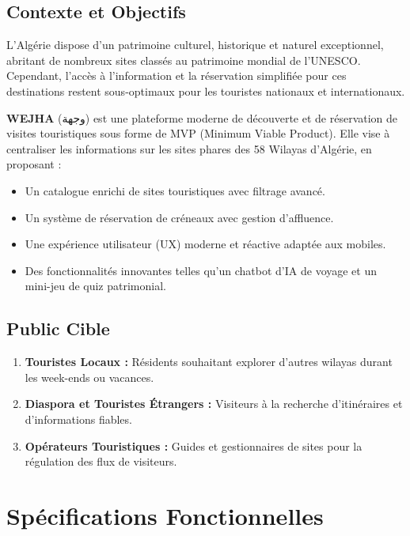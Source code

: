 \documentclass[11pt,a4paper]{article}
\begin{document}
\subsection{Contexte et Objectifs}
L'Algérie dispose d'un patrimoine culturel, historique et naturel exceptionnel, abritant de nombreux sites classés au patrimoine mondial de l'UNESCO. Cependant, l'accès à l'information et la réservation simplifiée pour ces destinations restent sous-optimaux pour les touristes nationaux et internationaux.

\textbf{WEJHA} (وجهة) est une plateforme moderne de découverte et de réservation de visites touristiques sous forme de MVP (Minimum Viable Product). Elle vise à centraliser les informations sur les sites phares des 58 Wilayas d'Algérie, en proposant :
\begin{itemize}
    \item Un catalogue enrichi de sites touristiques avec filtrage avancé.
    \item Un système de réservation de créneaux avec gestion d'affluence.
    \item Une expérience utilisateur (UX) moderne et réactive adaptée aux mobiles.
    \item Des fonctionnalités innovantes telles qu'un chatbot d'IA de voyage et un mini-jeu de quiz patrimonial.
\end{itemize}

\subsection{Public Cible}
\begin{enumerate}
    \item \textbf{Touristes Locaux :} Résidents souhaitant explorer d'autres wilayas durant les week-ends ou vacances.
    \item \textbf{Diaspora et Touristes Étrangers :} Visiteurs à la recherche d'itinéraires et d'informations fiables.
    \item \textbf{Opérateurs Touristiques :} Guides et gestionnaires de sites pour la régulation des flux de visiteurs.
\end{enumerate}

\section{Spécifications Fonctionnelles}
\end{document}
